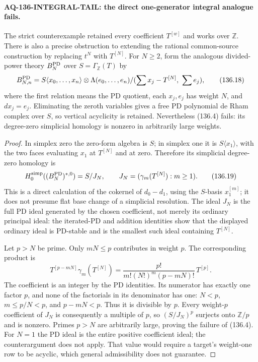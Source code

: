 \documentclass[11pt,a4paper]{article}
\theoremstyle{definition}\newtheorem{definition}[theorem]{Definition}
\theoremstyle{remark}\newtheorem{remark}[theorem]{Remark}
\begin{document}
\paragraph{AQ-136-INTEGRAL-TAIL: the direct one-generator integral analogue fails.}
The strict counterexample retained every coefficient
$T^{[w]}$ and works over $\mathbb Z$.  There is also a
precise obstruction to extending the rational common-source
construction by replacing $t^N$ with $T^{[N]}$.
For $N\geq2$, form the analogous divided-power theory
$B_N^{\rm PD}$ over $S=\Gamma_{\mathbb Z}(T)$ by
\[
 B_{N,n}^{\rm PD}
  =S\langle x_0,\ldots,x_n\rangle
       \otimes\Lambda(e_0,\ldots,e_n)
          /(\sum x_j-T^{[N]},\ \sum e_j),                   \tag{136.18}
\]
where the first relation means the PD quotient, each
$x_j,e_j$ has weight $N$, and $dx_j=e_j$.
Eliminating the zeroth variables gives a free PD
polynomial de Rham complex over $S$, so vertical
acyclicity is retained.  Nevertheless (136.4) fails:
its degree-zero simplicial homology is nonzero in
arbitrarily large weights.

\begin{proof}
In simplex zero the zero-form algebra is $S$; in
simplex one it is $S\langle x_1\rangle$, with the two
faces evaluating $x_1$ at $T^{[N]}$ and at zero.
Therefore its simplicial degree-zero homology is
\[
 H_0^{\rm simp}((B_N^{\rm PD})^{*,0})=S/J_N,
 \qquad J_N=(\gamma_m(T^{[N]}):m\geq1).                    \tag{136.19}
\]
This is a direct calculation of the cokernel of
$d_0-d_1$, using the $S$-basis $x_1^{[m]}$; it does
not presume flat base change of a simplicial
resolution.  The ideal $J_N$ is the full PD ideal
generated by the chosen coefficient, not merely
its ordinary principal ideal: the iterated-PD and
addition identities show that the displayed
ordinary ideal is PD-stable and is the smallest
such ideal containing $T^{[N]}$.

Let $p>N$ be prime.  Only $mN\leq p$ contributes
in weight $p$.  The corresponding product is
\[
 T^{[p-mN]}\gamma_m(T^{[N]})
   =\frac{p!}{m!(N!)^m(p-mN)!}\,T^{[p]}.                   \tag{136.20}
\]
The coefficient is an integer by the PD identities.
Its numerator has exactly one factor $p$, and
none of the factorials in its denominator has
one: $N<p$, $m\leq p/N<p$, and $p-mN<p$.
Thus it is divisible by $p$.
Every weight-$p$ coefficient of $J_N$ is consequently
a multiple of $p$, so $(S/J_N)^p$ surjects onto
$\mathbb Z/p$ and is nonzero.  Primes $p>N$ are
arbitrarily large, proving the failure of (136.4).
For $N=1$ the PD ideal is the entire positive
coefficient ideal; the counterargument does not
apply.  That value would require a target's
weight-one row to be acyclic, which general
admissibility does not guarantee.
\end{proof}
\end{document}
